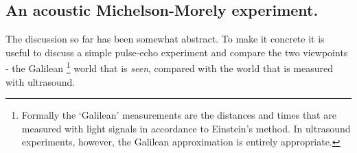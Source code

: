 \documentclass[10pt, fleqn,final,showtrims,oldfontcommands, article,a4paper,oneside]{memoir} %
\newcommand{\secref}[1]{section~\ref{sec:#1}}
\newcommand{\tm}{\tau^-}
\newcommand{\tp}{\tau^+}
\begin{document}
\subsection{An acoustic Michelson-Morely  experiment.}

The discussion so far has been somewhat abstract.
To make it concrete it is useful to discuss a simple pulse-echo experiment and  compare the two viewpoints
- the Galilean%
\footnote{Formally the `Galilean' measurements are the distances and times that are  measured with light signals in accordance to Einstein's method\cite{Einstein1905}.
In ultrasound experiments, however, the Galilean approximation is entirely appropriate.}
 world that is {\em seen}, compared with the world that is measured with ultrasound. %
%







\end{document}
